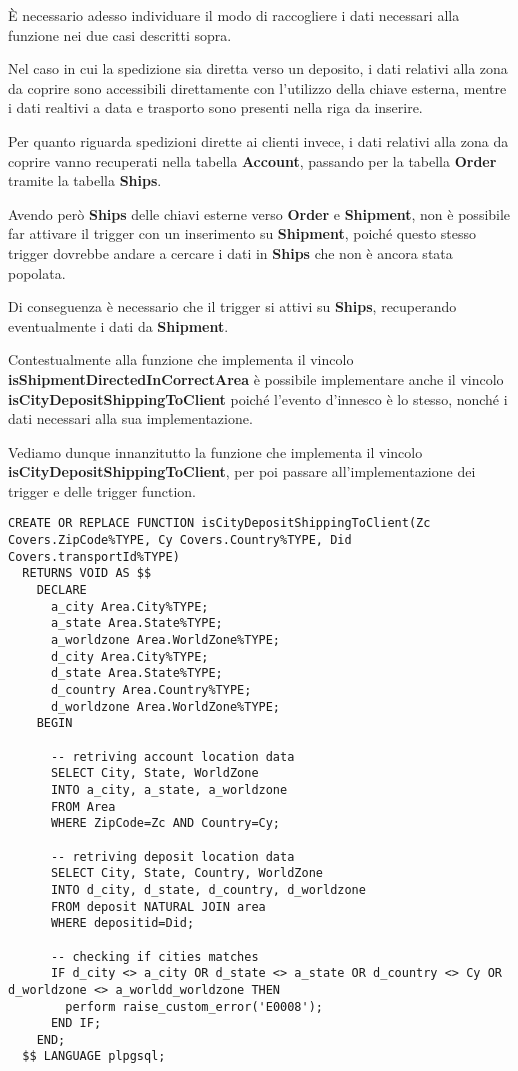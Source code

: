 È necessario adesso individuare il modo di raccogliere i dati necessari alla funzione nei due casi descritti sopra.

Nel caso in cui la spedizione sia diretta verso un deposito, i dati relativi alla zona da coprire sono accessibili direttamente con l'utilizzo della chiave esterna, mentre i dati realtivi a data e trasporto sono presenti nella riga da inserire.

Per quanto riguarda spedizioni dirette ai clienti invece, i dati relativi alla zona da coprire vanno recuperati nella tabella \textbf{Account}, passando per la tabella \textbf{Order} tramite la tabella \textbf{Ships}.

Avendo però \textbf{Ships} delle chiavi esterne verso \textbf{Order} e \textbf{Shipment}, non è possibile far attivare il trigger con un inserimento su \textbf{Shipment}, poiché questo stesso trigger dovrebbe andare a cercare i dati in \textbf{Ships} che non è ancora stata popolata.

Di conseguenza è necessario che il trigger si attivi su \textbf{Ships}, recuperando eventualmente i dati da \textbf{Shipment}.

Contestualmente alla funzione che implementa il vincolo \textbf{isShipmentDirectedInCorrectArea} è possibile implementare anche il vincolo \textbf{isCityDepositShippingToClient}
poiché l'evento d'innesco è lo stesso, nonché i dati necessari alla sua implementazione.

Vediamo dunque innanzitutto la funzione che implementa il vincolo \textbf{isCityDepositShippingToClient}, per poi passare all'implementazione dei trigger e delle trigger function.

\newpage
\begin{lstlisting}[caption={Funzione per il vincolo \textbf{isCityDepositShippingToClient}}]
  CREATE OR REPLACE FUNCTION isCityDepositShippingToClient(Zc Covers.ZipCode%TYPE, Cy Covers.Country%TYPE, Did Covers.transportId%TYPE)
  RETURNS VOID AS $$
    DECLARE 
      a_city Area.City%TYPE;
      a_state Area.State%TYPE;
      a_worldzone Area.WorldZone%TYPE;
      d_city Area.City%TYPE;
      d_state Area.State%TYPE;
      d_country Area.Country%TYPE;
      d_worldzone Area.WorldZone%TYPE;
    BEGIN

      -- retriving account location data
      SELECT City, State, WorldZone
      INTO a_city, a_state, a_worldzone
      FROM Area
      WHERE ZipCode=Zc AND Country=Cy;

      -- retriving deposit location data
      SELECT City, State, Country, WorldZone
      INTO d_city, d_state, d_country, d_worldzone
      FROM deposit NATURAL JOIN area
      WHERE depositid=Did;

      -- checking if cities matches
      IF d_city <> a_city OR d_state <> a_state OR d_country <> Cy OR d_worldzone <> a_worldd_worldzone THEN
        perform raise_custom_error('E0008');
      END IF; 
    END;
  $$ LANGUAGE plpgsql;
\end{lstlisting}

